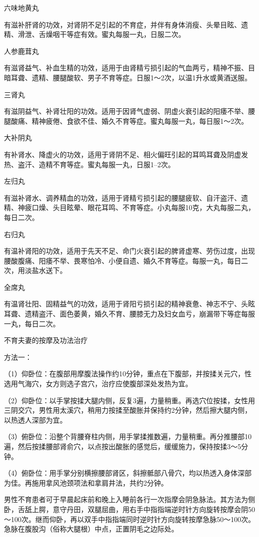 \documentclass[12pt,UTF8,openany]{ctexbook}
\begin{document}
六味地黄丸

有滋补肝肾的功效，对肾阴不足引起的不育症，并伴有身体消瘦、头晕目眩、遗精、滑泄、舌燥咽干等症有效。蜜丸每服一丸，日服二次。

人参鹿茸丸

有滋肾益气、补血生精的功效，适用于由肾精亏损引起的气血两亏，精神不振、目暗耳聋、遗精、腰腿酸软、男子不育等症。日服1～2次，以温1升水或黄酒送服。

三肾丸

有滋阴益气、补肾壮阳的功效。适用于因肾气虚弱、阴虚火衰引起的阳痿不举、腰腿酸痛、精神疲倦、食欲不佳、婚久不育等症。蜜丸每服一丸，每日服1～2次。

大补阴丸

有补肾水、降虚火的功效，适用于肾阴不足、相火偏旺引起的耳鸣耳聋及阴虚发热、盗汗、造精不育等症。蜜丸每服一丸，日服1--2次。

左归丸

有滋补肾水、调养精血的功效，适用于肾精亏损引起的腰腿疲软、自汗盗汗、遗精、神疲口燥、头目眩晕、眼花耳鸣、不育等症。小丸每服10克，大丸每服二丸，每日二次。

右归丸

有温补肾阳的功效，适用于先天不足、命门火衰引起的脾肾虚寒、劳伤过度，出现腰酸腹痛、阳痿不举、畏寒怕冷、小便自遗、婚久不育等症。每服一丸，每日二次，用淡盐水送下。

全席丸

有温肾壮阳、固精益气的功效，适用于肾阳亏损引起的精神衰惫、神志不宁、头眩耳聋、遗精盗汗、面色萎黄，婚久不育、腰膝无力及妇女血亏，崩漏带下等症每服一丸，每日二次。





不育夫妻的按摩及功法治疗


方法一：

（1）仰卧位：在腹部用摩腹法操作约10分钟，重点在下腹部，并按揉关元穴，性选用气海穴，女方则选子宫穴，治疗应使腹部深处发热为宜。

（2）仰卧位：以手掌按揉大腿内侧，反复3遍，力量稍重。再选穴位按揉，女性用三阴交穴，男性用太溪穴，稍用力按揉至酸胀并保持约2分钟，然后擦大腿内侧，以热透人深部为宜。

（3）俯卧位：沿整个背腰脊柱内侧，用手掌揉推数遍，力量稍重。再分推腰部10遍，然后按揉腰部肾俞穴，以点按出酸胀的感觉后，缓缓施力，保持按揉3～5分钟。

（4）俯卧位：用手掌分别横擦腰部肾区，斜擦骶部八骨穴，均以热透入身体深部为佳。再施用拿风池颈项法和拿肩井法，共约2分钟。

男性不育患者可于早晨起床前和晚上入睡前各行一次指摩会阴急脉法。其方法为侧卧，舌舐上腭，意守丹田，双腿屈曲，用右手中指指端逆时针方向旋转按摩会阴50～100次。继而仰卧，再以双手中指指端同时逆时针方向旋转按摩急脉50～100次。急脉在腹股沟（俗称大腿根）中点，正置阴毛之边际处。
\end{document}
